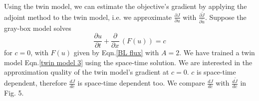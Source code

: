 \documentclass[a4paper,onecolumn]{article}
\theoremstyle{remark}
\begin{document}
Using the twin model, we can estimate the objective's gradient by applying the
adjoint method to the twin model, i.e. we approximate
$\frac{\partial J}{\partial u}$ with $\frac{\partial \tilde{J}}{\partial \tilde{u}}$.
Suppose the gray-box model solves
\begin{equation}
    \frac{\partial u}{\partial t} + \frac{\partial}{\partial x}\,
    \left(F(u)\right) = c
\end{equation}
for $c=0$, with $F(u)$ given by Eqn.\eqref{BL flux} with $A=2$. We have trained a twin model
Eqn.\eqref{twin model 3} using the space-time solution. We are interested in
the approximation quality of the twin model's gradient at $c=0$.
$c$ is space-time dependent, therefore $\frac{dJ}{dc}$ is space-time dependent too.
We compare $\frac{dJ}{dc}$ with $\frac{d\tilde{J}}{dc}$ in Fig. 5.
\end{document}

